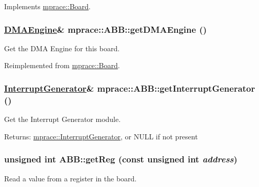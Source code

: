 Implements \hyperlink{classmprace_1_1Board_a13}{mprace::Board}.\hypertarget{classmprace_1_1ABB_a10}{
\subsubsection[getDMAEngine]{\setlength{\rightskip}{0pt plus 5cm}\hyperlink{classmprace_1_1DMAEngine}{DMAEngine}\& mprace::ABB::get\-DMAEngine ()}}
\label{classmprace_1_1ABB_a10}


Get the DMA Engine for this board. 



Reimplemented from \hyperlink{classmprace_1_1Board_a12}{mprace::Board}.\hypertarget{classmprace_1_1ABB_a11}{
\subsubsection[getInterruptGenerator]{\setlength{\rightskip}{0pt plus 5cm}\hyperlink{classmprace_1_1InterruptGenerator}{Interrupt\-Generator}\& mprace::ABB::get\-Interrupt\-Generator ()}}
\label{classmprace_1_1ABB_a11}


Get the Interrupt Generator module. 

\begin{Desc}
\item[Returns:]\hyperlink{classmprace_1_1InterruptGenerator}{mprace::Interrupt\-Generator}, or NULL if not present\end{Desc}
\hypertarget{classmprace_1_1ABB_a3}{
\subsubsection[getReg]{\setlength{\rightskip}{0pt plus 5cm}unsigned int ABB::get\-Reg (const unsigned int {\em address})}}
\label{classmprace_1_1ABB_a3}


Read a value from a register in the board. 

